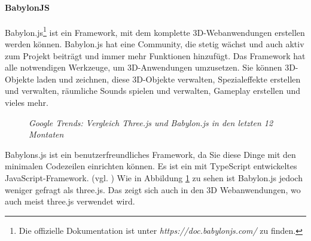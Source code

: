 \paragraph{BabylonJS}
\label{sec:babylonJS}
%
Babylon.js\footnote{Die offizielle Dokumentation ist unter \textit{https://doc.babylonjs.com/} zu finden.} ist ein Framework, mit dem komplette 3D-Webanwendungen erstellen werden können. Babylon.js hat eine Community, die stetig wächst und auch aktiv zum Projekt beiträgt und immer mehr Funktionen hinzufügt. Das Framework hat alle notwendigen Werkzeuge, um 3D-Anwendungen umzusetzen. Sie können 3D-Objekte laden und zeichnen, diese 3D-Objekte verwalten, Spezialeffekte erstellen und verwalten, räumliche Sounds spielen und verwalten, Gameplay erstellen und vieles mehr. 
%
\begin{figure}[h]
	\centering
	{}
	\caption[Audi Konfigurator]{\textit{Google Trends: Vergleich Three.js und Babylon.js in den letzten 12 Montaten}}
	\label{fig:compare3dframework}
\end{figure}
%
Babylons.js ist ein benutzerfreundliches Framework, da Sie diese Dinge mit den minimalen Codezeilen einrichten können. Es ist ein mit TypeScript entwickeltes JavaScript-Framework. (vgl. \cite{moreau-mathis_babylon.js_2016}) Wie in Abbildung \ref{fig:compare3dframework} zu sehen ist Babylon.js jedoch weniger gefragt als three.js. Das zeigt sich auch in den 3D Webanwendungen, wo auch meist three.js verwendet wird.
